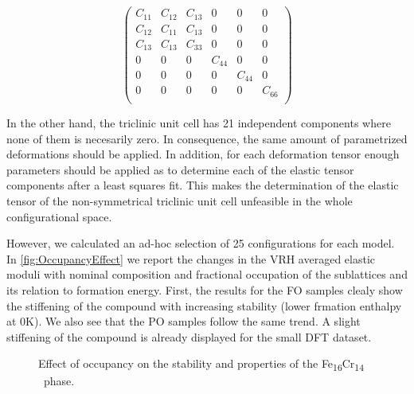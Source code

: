 \documentclass[superscriptaddress, 12pt]{revtex4-2}%
\begin{document}
\begin{equation}
  \begin{pmatrix}
    C_{11} & C_{12} & C_{13} & 0 & 0 & 0 \\
    C_{12} & C_{11} & C_{13} & 0 & 0 & 0 \\
    C_{13} & C_{13} & C_{33} & 0 & 0 & 0 \\
    0 & 0 & 0 & C_{44} & 0 & 0 \\
    0 & 0 & 0 & 0 & C_{44} & 0 \\
    0 & 0 & 0 & 0 & 0 & C_{66} \\
  \end{pmatrix}
\end{equation}

In the other hand, the triclinic unit cell has 21 independent components where none of them is necesarily zero. 
In consequence, the same amount of parametrized deformations should be applied.
In addition, for each deformation tensor enough parameters should be applied as to determine each of the elastic tensor components after a least squares fit.
This makes the determination of the elastic tensor of the non-symmetrical triclinic unit cell unfeasible in the whole configurational space.

 However, we calculated an ad-hoc selection of 25 configurations for each model. 
 In \autoref{fig:OccupancyEffect} we report the changes in the VRH averaged elastic moduli with nominal composition and fractional occupation of the sublattices and its relation to formation energy.
 First, the results for the FO samples clealy show the stiffening of the compound with increasing stability (lower frmation enthalpy at 0K).
 We also see that the PO samples follow the same trend.
 A slight stiffening of the compound is already displayed for the small DFT dataset.

\begin{figure}[H]
 \caption{\protect\label{fig:OccupancyEffect}
  Effect of occupancy on the stability and properties of the Fe\textsubscript{16}Cr\textsubscript{14} \textsigma ~phase.
 }
\end{figure}
\end{document}
